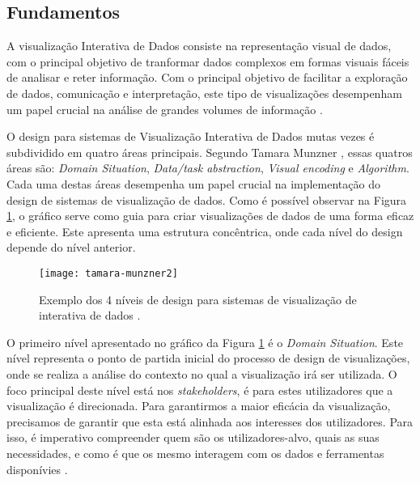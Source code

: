 \subsection{Fundamentos} %
\label{sub:fundamentos}
A visualização Interativa de Dados consiste na representação visual de dados, com o principal objetivo de tranformar dados complexos em formas visuais fáceis de analisar e reter informação. Com o principal objetivo de facilitar a exploração de dados, comunicação e interpretação, este tipo de visualizações desempenham um papel crucial na análise de grandes volumes de informação \cite{keim2002information}.
                                                                                                                        
O design para sistemas de Visualização Interativa de Dados mutas vezes é subdividido em quatro áreas principais. Segundo Tamara Munzner \cite{munzner2014visualization}, essas quatros áreas são: \textit{Domain Situation}, \textit{Data/task abstraction}, \textit{Visual encoding} e \textit{Algorithm}. Cada uma destas áreas desempenha um papel crucial na implementação do design de sistemas de visualização de dados. Como é possível observar na Figura \ref{fig:tamara-munzner-principles}, o gráfico serve como guia para criar visualizações de dados de uma forma eficaz e eficiente. Este apresenta uma estrutura concêntrica, onde cada nível do design depende do nível anterior.

\begin{figure}[htbp]
  \centering
  \texttt{[image: tamara-munzner2]}
  \caption{Exemplo dos 4 níveis de design para sistemas de visualização de interativa de dados \cite{munzner2014visualization}.}
  \label{fig:tamara-munzner-principles}
\end{figure}

O primeiro nível apresentado no gráfico da Figura \ref{fig:tamara-munzner-principles} é o \textit{Domain Situation}. Este nível representa o ponto de partida inicial do processo de design de visualizações, onde se realiza a análise do contexto no qual a visualização irá ser utilizada. O foco principal deste nível está nos \textit{stakeholders}, é para estes utilizadores que a visualização é direcionada.
Para garantirmos a maior eficácia da visualização, precisamos de garantir que esta está alinhada aos interesses dos utilizadores. Para isso, é imperativo compreender quem são os utilizadores-alvo, quais as suas necessidades, e como é que os mesmo interagem com os dados e ferramentas disponívies \cite{courage2005understanding}.

